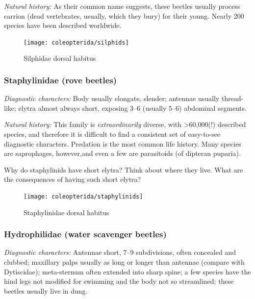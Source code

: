 \noindent{}\textit{Natural history:} As their common name suggests, these beetles usually process carrion (dead vertebrates, usually, which they bury) for their young. Nearly 200 species have been described worldwide.

\begin{figure}[ht!]
  \centering
    \texttt{[image: coleopterida/silphids]}
  \caption{Silphidae dorsal habitus \citep[][Fig. 142]{bhlitem92397}}
  \label{fig:silphid}
\end{figure}

\subsubsection{Staphylinidae (rove beetles)}
\noindent{}\textit{Diagnostic characters:} Body usually elongate, slender; antennae usually thread-like; elytra almost always short, exposing 3--6 (usually 5--6) abdominal segments.\vspace{3mm}

\noindent{}\textit{Natural history:} This family is \textit{extraordinarily} diverse, with \textgreater60,000(!) described species, and therefore it is difficult to find a consistent set of easy-to-see diagnostic characters. Predation is the most common life history. Many species are saprophages, however,and even a few are parasitoids (of dipteran puparia).\vspace{3mm}

\begin{theo}
{}Why do staphylinids have short elytra? Think about where they live. What are the consequences of having such short elytra?
\end{theo}

\begin{figure}[ht!]
  \centering
    \texttt{[image: coleopterida/staphylinids]}
  \caption{Staphylinidae dorsal habitus \citep[][Plate I]{bhlitem132642}}
  \label{fig:staphylinids}
\end{figure}

\subsubsection{Hydrophilidae (water scavenger beetles)}
\noindent{}\textit{Diagnostic characters:} Antennae short, 7--9 subdivisions, often concealed and clubbed; maxillary palps usually as long or longer than antennae (compare with Dytiscidae); meta-sternum often extended into sharp spine; a few species have the hind legs not modified for swimming and the body not so streamlined; these beetles usually live in dung.\vspace{3mm}

